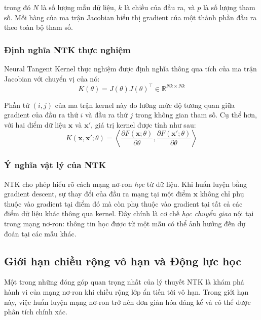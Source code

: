 trong đó $N$ là số lượng mẫu dữ liệu, $k$ là chiều của đầu ra, và $p$ là số lượng tham số. Mỗi hàng của ma trận Jacobian biểu thị gradient của một thành phần đầu ra theo toàn bộ tham số.

\subsubsection{Định nghĩa NTK thực nghiệm}

Neural Tangent Kernel thực nghiệm được định nghĩa thông qua tích của ma trận Jacobian với chuyển vị của nó:
\begin{equation}
    K(\theta) = J(\theta) J(\theta)^\top \in \mathbb{R}^{Nk \times Nk}
\end{equation}

Phần tử $(i,j)$ của ma trận kernel này đo lường mức độ tương quan giữa gradient của đầu ra thứ $i$ và đầu ra thứ $j$ trong không gian tham số. Cụ thể hơn, với hai điểm dữ liệu $\mathbf{x}$ và $\mathbf{x}'$, giá trị kernel được tính như sau:
\begin{equation}
    K(\mathbf{x}, \mathbf{x}'; \theta) = \left\langle \frac{\partial F(\mathbf{x}; \theta)}{\partial \theta}, \frac{\partial F(\mathbf{x}'; \theta)}{\partial \theta} \right\rangle
\end{equation}

\subsubsection{Ý nghĩa vật lý của NTK}

NTK cho phép hiểu rõ cách mạng nơ-ron \textit{học} từ dữ liệu. Khi huấn luyện bằng gradient descent, sự thay đổi của đầu ra mạng tại một điểm $\mathbf{x}$ không chỉ phụ thuộc vào gradient tại điểm đó mà còn phụ thuộc vào gradient tại tất cả các điểm dữ liệu khác thông qua kernel. Đây chính là cơ chế \textit{học chuyển giao} nội tại trong mạng nơ-ron: thông tin học được từ một mẫu có thể ảnh hưởng đến dự đoán tại các mẫu khác.

\subsection{Giới hạn chiều rộng vô hạn và Động lực học}

Một trong những đóng góp quan trọng nhất của lý thuyết NTK là khám phá hành vi của mạng nơ-ron khi chiều rộng lớp ẩn tiến tới vô hạn. Trong giới hạn này, việc huấn luyện mạng nơ-ron trở nên đơn giản hóa đáng kể và có thể được phân tích chính xác.

